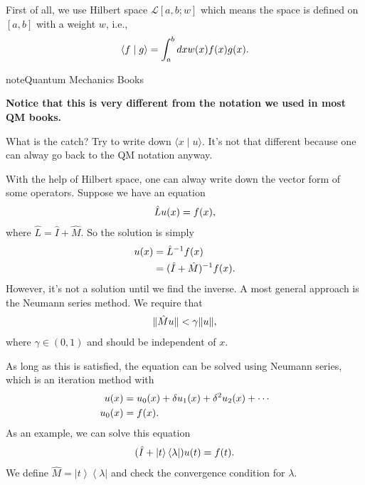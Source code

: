\documentclass[letterpaper,10pt,english]{sphinxmanual}
\newcommand{\bra}[1]{\left\langle #1\right|}
\newcommand{\ket}[1]{\left| #1\right\rangle}
\newcommand{\braket}[2]{\langle #1 \mid #2 \rangle}
\begin{document}
First of all, we use Hilbert space \(\mathscr L[a,b;w]\) which means the space is defined on \([a,b]\) with a weight \(w\), i.e.,
\begin{gather}
\begin{split}\braket{f}{g} = \int_a^b dx w(x) f(x) g(x).\end{split}\notag
\end{gather}
\begin{notice}{note}{Quantum Mechanics Books}

\textbf{Notice that this is very different from the notation we used in most QM books.}

What is the catch? Try to write down \(\braket{x}{u}\). It's not that different because one can alway go back to the QM notation anyway.
\end{notice}

With the help of Hilbert space, one can alway write down the vector form of some operators. Suppose we have an equation
\begin{gather}
\begin{split}\hat L u(x) = f(x),\end{split}\notag
\end{gather}
where \(\hat L=\hat I + \hat M\). So the solution is simply
\begin{gather}
\begin{split}u(x) &= {\hat L}^{-1} f(x)\\
&=(\hat I + \hat M)^{-1} f(x) .\end{split}\notag
\end{gather}
However, it's not a solution until we find the inverse. A most general approach is the Neumann series method. We require that
\begin{gather}
\begin{split}\| \hat M u \| < \gamma \| u \|,\end{split}\notag
\end{gather}
where \(\gamma\in (0,1)\) and should be independent of \(x\).

As long as this is satisfied, the equation can be solved using Neumann series, which is an iteration method with
\begin{gather}
\begin{split}u(x)&=u_0(x)+ \delta u_1(x) + \delta^2 u_2(x) +\cdots \\
u_0(x) & = f(x).\end{split}\notag
\end{gather}
As an example, we can solve this equation
\begin{gather}
\begin{split}(\hat I + \ket{t}\bra{\lambda}) u(t) = f(t).\end{split}\notag
\end{gather}
We define \(\hat M = \ket{t}\bra{\lambda}\) and check the convergence condition for \(\lambda\).
\end{document}
